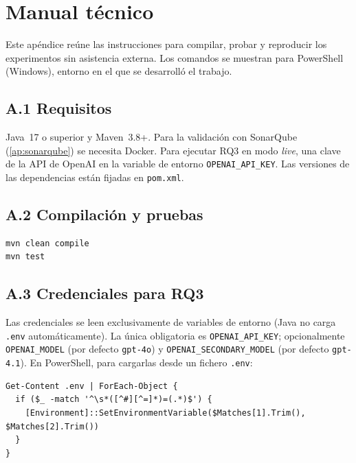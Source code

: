 \appendix
\label{cap:apendices}

\chapter{Manual técnico}
\label{ap:manual}
Este apéndice reúne las instrucciones para compilar, probar y reproducir los
experimentos sin asistencia externa. Los comandos se muestran para PowerShell
(Windows), entorno en el que se desarrolló el trabajo.

\section*{A.1 Requisitos}
Java~17 o superior y Maven~3.8+. Para la validación con SonarQube
(\autoref{ap:sonarqube}) se necesita Docker. Para ejecutar RQ3 en modo
\emph{live}, una clave de la API de OpenAI en la variable de entorno
\texttt{OPENAI\_API\_KEY}. Las versiones de las dependencias están fijadas en
\texttt{pom.xml}.

\section*{A.2 Compilación y pruebas}
\begin{lstlisting}[language={},basicstyle=\footnotesize\ttfamily]
mvn clean compile
mvn test
\end{lstlisting}

\section*{A.3 Credenciales para RQ3}
Las credenciales se leen exclusivamente de variables de entorno (Java no carga
\texttt{.env} automáticamente). La única obligatoria es \texttt{OPENAI\_API\_KEY};
opcionalmente \texttt{OPENAI\_MODEL} (por defecto \texttt{gpt-4o}) y
\texttt{OPENAI\_SECONDARY\_MODEL} (por defecto \texttt{gpt-4.1}). En PowerShell,
para cargarlas desde un fichero \texttt{.env}:
\begin{lstlisting}[language={},basicstyle=\footnotesize\ttfamily]
Get-Content .env | ForEach-Object {
  if ($_ -match '^\s*([^#][^=]*)=(.*)$') {
    [Environment]::SetEnvironmentVariable($Matches[1].Trim(), $Matches[2].Trim())
  }
}
\end{lstlisting}

